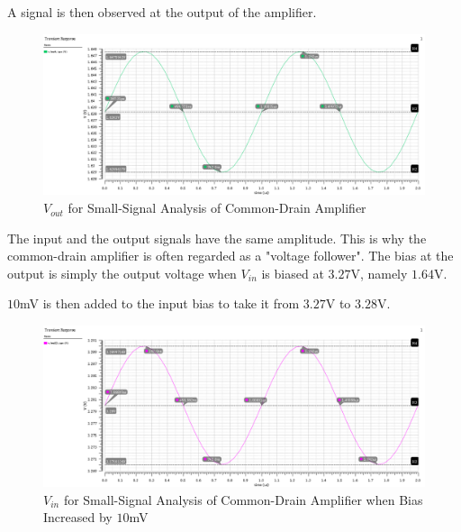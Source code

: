 \FloatBarrier

A signal is then observed at the output of the amplifier.

\FloatBarrier

\begin{figure}[h!]
	\centering
	\includegraphics[scale=0.45]{./images/sim1_vout.PNG}
	\caption{$V_{out}$ for Small-Signal Analysis of Common-Drain Amplifier}
	\label{fig:sim1_vout}
\end{figure}

\FloatBarrier

The input and the output signals have the same amplitude.
This is why the common-drain amplifier is often regarded as a "voltage follower".
The bias at the output is simply the output voltage when $V_{in}$ is biased at $3.27$\si{\volt}, namely $1.64$\si{\volt}.

$10$\si{\milli\volt} is then added to the input bias to take it from $3.27$\si{\volt} to $3.28$\si{\volt}.

\FloatBarrier

\begin{figure}[h!]
	\centering
	\includegraphics[scale=0.45]{./images/sim1_vin_plus10mV.PNG}
	\caption{$V_{in}$ for Small-Signal Analysis of Common-Drain Amplifier when Bias Increased by $10$\si{\milli\volt}}
	\label{fig:sim1_vin_plus10mV}
\end{figure}

